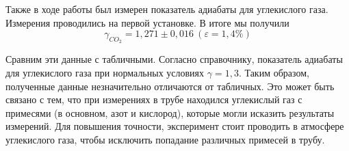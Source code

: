 \documentclass[a4paper,12pt]{article}
\theoremstyle{definition}
\begin{document}
	Также в ходе работы был измерен показатель адиабаты для углекислого газа. Измерения проводились на первой установке. В итоге мы получили \[ {\gamma_{CO_2} = 1,271 \pm 0,016}\ (\varepsilon=1,4\%) \]
	
	Сравним эти данные с табличными. Согласно справочнику, показатель адиабаты для углекислого газа при нормальных условиях $ \gamma = 1,3 $. Таким образом, полученные данные незначительно отличаются от табличных. Это может быть связано с тем, что при измерениях в трубе находился углекислый газ с примесями (в основном, азот и кислород), которые могли исказить результаты измерений. Для повышения точности, эксперимент стоит проводить в атмосфере углекислого газа, чтобы исключить попадание различных примесей в трубу.
	
	
	
	
	
	
\end{document}
